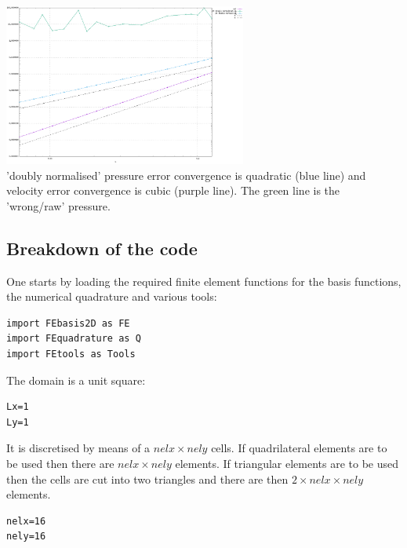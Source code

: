 \begin{center}
\includegraphics[width=8cm]{python_codes/fieldstone_120/images/q2q1q0}\\
{\captionfont 'doubly normalised' pressure error convergence is quadratic (blue line) and 
velocity error convergence is cubic (purple line). The green line is the 'wrong/raw' pressure. }
\end{center}




\newpage
\subsection*{Breakdown of the code}

One starts by loading the required finite element functions 
for the basis functions, the numerical quadrature and various tools:
\begin{lstlisting}
import FEbasis2D as FE
import FEquadrature as Q
import FEtools as Tools 
\end{lstlisting}

The domain is a unit square:
\begin{lstlisting}
Lx=1
Ly=1
\end{lstlisting}

It is discretised by means of a $nelx\times nely$ cells. If quadrilateral 
elements are to be used then there are $nelx\times nely$ elements. If 
triangular elements are to be used then the cells are cut into two 
triangles and there are then $2\times nelx\times nely$ elements.

\begin{lstlisting}
nelx=16
nely=16
\end{lstlisting}


